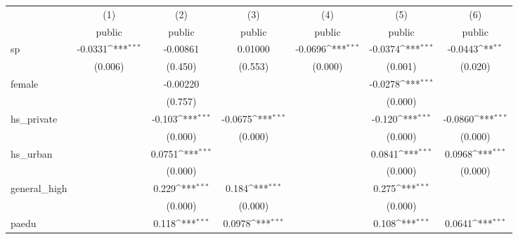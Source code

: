 \documentclass[11pt, letterpaper]{article}
\begin{document}
{
\def\sym#1{\ifmmode^{#1}\else\(^{#1}\)\fi}
\begin{tabular}{l*{6}{c}}
\hline\hline
            &\multicolumn{1}{c}{(1)}&\multicolumn{1}{c}{(2)}&\multicolumn{1}{c}{(3)}&\multicolumn{1}{c}{(4)}&\multicolumn{1}{c}{(5)}&\multicolumn{1}{c}{(6)}\\
            &\multicolumn{1}{c}{public}&\multicolumn{1}{c}{public}&\multicolumn{1}{c}{public}&\multicolumn{1}{c}{public}&\multicolumn{1}{c}{public}&\multicolumn{1}{c}{public}\\
\hline
sp          &     -0.0331\sym{***}&    -0.00861         &     0.01000         &     -0.0696\sym{***}&     -0.0374\sym{***}&     -0.0443\sym{**} \\
            &     (0.006)         &     (0.450)         &     (0.553)         &     (0.000)         &     (0.001)         &     (0.020)         \\
[1em]
female      &                     &    -0.00220         &                     &                     &     -0.0278\sym{***}&                     \\
            &                     &     (0.757)         &                     &                     &     (0.000)         &                     \\
[1em]
hs\_private  &                     &      -0.103\sym{***}&     -0.0675\sym{***}&                     &      -0.120\sym{***}&     -0.0860\sym{***}\\
            &                     &     (0.000)         &     (0.000)         &                     &     (0.000)         &     (0.000)         \\
[1em]
hs\_urban    &                     &      0.0751\sym{***}&                     &                     &      0.0841\sym{***}&      0.0968\sym{***}\\
            &                     &     (0.000)         &                     &                     &     (0.000)         &     (0.000)         \\
[1em]
general\_high&                     &       0.229\sym{***}&       0.184\sym{***}&                     &       0.275\sym{***}&                     \\
            &                     &     (0.000)         &     (0.000)         &                     &     (0.000)         &                     \\
[1em]
paedu       &                     &       0.118\sym{***}&      0.0978\sym{***}&                     &       0.108\sym{***}&      0.0641\sym{***}\\

\end{tabular}}
\end{document}

